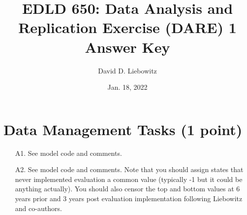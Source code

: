 \documentclass[a4paper, 11pt]{article}
\title{EDLD 650: Data Analysis and Replication Exercise (DARE) 1
Answer Key}
\author{David D. Liebowitz}
\date{Jan. 18, 2022}
\begin{document}
\maketitle

\section{Data Management Tasks (1 point)}
\begin{enumerate}
	\item[A1.] See model code and comments.
	\item[A2.] See model code and comments. Note that you should assign states that never implemented evaluation a common value (typically -1 but it could be anything actually). You should also censor the top and bottom values at 6 years prior and 3 years post evaluation implementation following Liebowitz and co-authors.
\end{enumerate}
\end{document}
